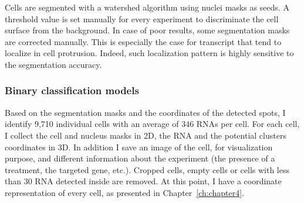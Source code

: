 Cells are segmented with a watershed algorithm using nuclei masks as seeds.
A threshold value is set manually for every experiment to discriminate the cell surface from the background.
In case of poor results, some segmentation masks are corrected manually.
This is especially the case for transcript that tend to localize in cell protrusion.
Indeed, such localization pattern is highly sensitive to the segmentation accuracy.

\subsubsection{Binary classification models}

Based on the segmentation masks and the coordinates of the detected spots, I identify 9,710 individual cells with an average of 346 \ac{RNA}s per cell.
For each cell, I collect the cell and nucleus masks in 2D, the \ac{RNA} and the potential clusters coordinates in 3D.
In addition I save an image of the cell, for visualization purpose, and different information about the experiment (the presence of a treatment, the targeted gene, etc.).
Cropped cells, empty cells or cells with less than 30 \ac{RNA} detected inside are removed.
At this point, I have a coordinate representation of every cell, as presented in Chapter~\ref{ch:chapter4}.

